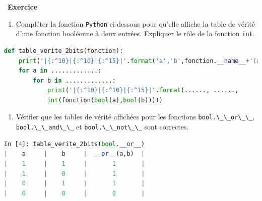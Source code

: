 \documentclass[
  11pt,
]{article}
\newcommand{\passthrough}[1]{#1}
\providecommand{\tightlist}{%
  \setlength{\itemsep}{0pt}\setlength{\parskip}{0pt}}
\newcounter{exo}
\newenvironment{exercice}[1]
{\par \medskip   \addtocounter{exo}{1} \noindent  
\begin{bclogo}[arrondi =0.1,   noborder = true, logo=\bccrayon, marge=4]{~\textbf{Exercice} \textbf{\theexo} {\itshape #1} }  \par}
{
\end{bclogo}
 \par \bigskip }
\newcounter{def}
\begin{document}
\begin{exercice}{}

\begin{enumerate}
\def\labelenumi{\arabic{enumi}.}
\tightlist
\item
  Compléter la fonction \passthrough{\lstinline!Python!} ci-dessous pour
  qu'elle affiche la table de vérité d'une fonction booléenne à deux
  entrées. Expliquer le rôle de la fonction
  \passthrough{\lstinline!int!}.
\end{enumerate}

\begin{lstlisting}[language=Python]
def table_verite_2bits(fonction):
    print('|{:^10}|{:^10}|{:^15}|'.format('a','b',fonction.__name__+'(a,b)'))
    for a in .............:
        for b in .............:
            print('|{:^10}|{:^10}|{:^15}|'.format(......, ......, 
            int(fonction(bool(a),bool(b)))))
\end{lstlisting}

\begin{enumerate}
\def\labelenumi{\arabic{enumi}.}
\setcounter{enumi}{1}
\tightlist
\item
  Vérifier que les tables de vérité affichées pour les fonctions
  \passthrough{\lstinline!bool.\_\_or\_\_!},
  \passthrough{\lstinline!bool.\_\_and\_\_!} et
  \passthrough{\lstinline!bool.\_\_not\_\_!} sont correctes.
\end{enumerate}

\begin{lstlisting}[language=Python]
In [4]: table_verite_2bits(bool.__or__)                                                                                                                                           
|    a     |    b     |  __or__(a,b)  |
|    1     |    1     |       1       |
|    1     |    0     |       1       |
|    0     |    1     |       1       |
|    0     |    0     |       0       |
\end{lstlisting}

\end{exercice}
\end{document}
